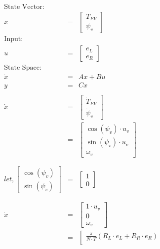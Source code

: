 \documentclass[12pt]{article}
\begin{document}
	\begin{eqnarray}
	\text{State Vector:}&& \nonumber\\
	x &=& \left[
	\begin{array}{c}
	T_{EV}\\
	\psi_v 
	\end{array}
	\right]\\
	\text{Input:}&& \nonumber \\
	u &=& \left[
	\begin{array}{c}
	e_L\\
	e_R 
	\end{array}
	\right]\\
	\text{State Space:}&& \nonumber\\
	\dot{x} &=& Ax+Bu\\
	y &=& Cx\\
	\nonumber \\
	\dot{x} &=& \left[
	\begin{array}{c}
	\dot{T}_{EV}\\
	\dot{\psi}_v 
	\end{array}
	\right] \nonumber \\
	&=& \left[
	\begin{array}{c}
	\cos(\psi_v)\cdot u_v\\
	\sin(\psi_v)\cdot u_v\\
	\omega_v 
	\end{array}
	\right] \nonumber\\
	\nonumber \\
	\nonumber \\
	let, \left[
	\begin{array}{c}
	\cos(\psi_v)\\
	\sin(\psi_v) 
	\end{array}
	\right] &=& \left[
	\begin{array}{c}
	1\\
	0
	\end{array}
	\right] \nonumber \\
	\nonumber \\
	\nonumber \\
	\dot{x} &=& \left[
	\begin{array}{c}
	1\cdot u_v\\
	0\\
	\omega_v 
	\end{array}
	\right] \nonumber \\
	&=& \left[
	\begin{array}{c}
	\frac{\pi}{N\cdot T}(R_L\cdot e_L + R_R\cdot e_R)\\

\end{array}
\end{eqnarray}
\end{document}
